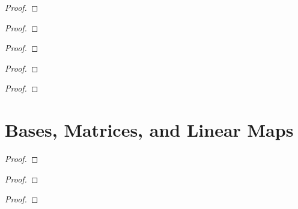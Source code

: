 \begin{proof}
\end{proof}

\begin{exercise}
\end{exercise}

\begin{proof}
\end{proof}

\begin{exercise}
\end{exercise}

\begin{proof}
\end{proof}

\begin{exercise}
\end{exercise}

\begin{proof}
\end{proof}

\begin{exercise}
\end{exercise}

\begin{proof}
\end{proof}

\section{Bases, Matrices, and Linear Maps}
\setcounter{exercise}{0}

\begin{exercise}
\end{exercise}

\begin{proof}
\end{proof}

\begin{exercise}
\end{exercise}

\begin{proof}
\end{proof}

\begin{exercise}
\end{exercise}

\begin{proof}
\end{proof}

\begin{exercise}
\end{exercise}

